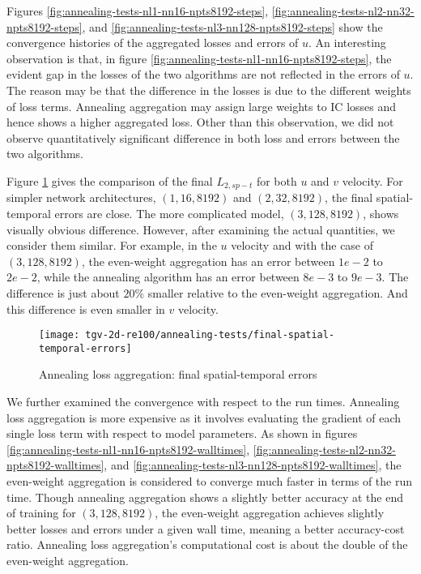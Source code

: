 Figures \ref{fig:annealing-tests-nl1-nn16-npts8192-steps}, \ref{fig:annealing-tests-nl2-nn32-npts8192-steps}, and \ref{fig:annealing-tests-nl3-nn128-npts8192-steps} show the convergence histories of the aggregated losses and errors of $u$.
An interesting observation is that, in figure \ref{fig:annealing-tests-nl1-nn16-npts8192-steps}, the evident gap in the losses of the two algorithms are not reflected in the errors of $u$.
The reason may be that the difference in the losses is due to the different weights of loss terms.
Annealing aggregation may assign large weights to IC losses and hence shows a higher aggregated loss.
Other than this observation, we did not observe quantitatively significant difference in both loss and errors between the two algorithms.

Figure \ref{fig:annealing-tests-final-sterrs} gives the comparison of the final $L_{2,sp-t}$ for both $u$ and $v$ velocity.
For simpler network architectures, $(1, 16, 8192)$ and $(2, 32, 8192)$, the final spatial-temporal errors are close.
The more complicated model, $(3, 128, 8192)$, shows visually obvious difference.
However, after examining the actual quantities, we consider them similar.
For example, in the $u$ velocity and with the case of $(3, 128, 8192)$, the even-weight aggregation has an error between $1e-2$ to $2e-2$, while the annealing algorithm has an error between $8e-3$ to $9e-3$.
The difference is just about $20\%$ smaller relative to the even-weight aggregation.
And this difference is even smaller in $v$ velocity.

\begin{figure}[hbt!]
    \centering%
    \texttt{[image: tgv-2d-re100/annealing-tests/final-spatial-temporal-errors]}%
    \caption[%
        Annealing loss aggregation: final spatial-temporal errors%
    ]{%
        Annealing loss aggregation: final spatial-temporal errors%
    }\label{fig:annealing-tests-final-sterrs}%
\end{figure}

We further examined the convergence with respect to the run times.
Annealing loss aggregation is more expensive as it involves evaluating the gradient of each single loss term with respect to model parameters.
As shown in figures \ref{fig:annealing-tests-nl1-nn16-npts8192-walltimes}, \ref{fig:annealing-tests-nl2-nn32-npts8192-walltimes}, and \ref{fig:annealing-tests-nl3-nn128-npts8192-walltimes}, the even-weight aggregation is considered to converge much faster in terms of the run time.
Though annealing aggregation shows a slightly better accuracy at the end of training for $(3, 128, 8192)$, the even-weight aggregation achieves slightly better losses and errors under a given wall time, meaning a better accuracy-cost ratio.
Annealing loss aggregation's computational cost is about the double of the even-weight aggregation. 


